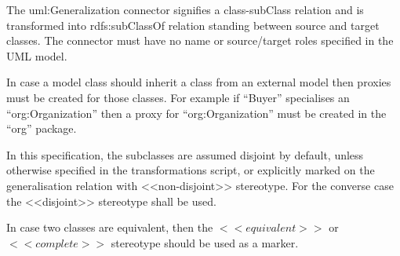 	The uml:Generalization connector signifies a class-subClass relation and is transformed into rdfs:subClassOf relation standing between source and target classes. The connector must have no name or source/target roles specified in the UML model.
	
	In case a model class should inherit a class from an external model then proxies must be created for those classes. For example if ``Buyer'' specialises an ``org:Organization'' then a proxy for ``org:Organization'' must be created in the ``org'' package. 
	
	In this specification, the subclasses are assumed disjoint by default, unless otherwise specified in the transformations script, or explicitly marked on the generalisation relation with <<non-disjoint>> stereotype. For the converse case the <<disjoint>> stereotype shall be used.
	 
	In case two classes are equivalent, then the $<<equivalent>>$ or $<<complete>>$ stereotype should be used as a marker. 
	
	